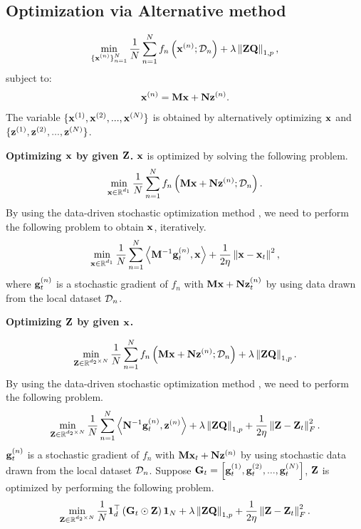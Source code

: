\documentclass[journal]{IEEEtran}
\begin{document}
\subsection{Optimization via Alternative method}

\begin{align}
\min_{\substack{\{{\bf x}^{(n)}\}_{n=1}^N}} \frac{1}{N}\sum_{n=1}^N f_n\left( {\bf x}^{(n)}; \mathcal{D}_n \right) + \lambda \left\lVert{\bf Z}{\bf Q}\right\rVert_{1,p},
\end{align} subject to:
\begin{align}
{\bf x}^{(n)} = {\bf M}{\bf x} + {\bf N} {\bf z}^{(n)}.
\end{align}
The variable $\{{\bf x}^{(1)}, {\bf x}^{(2)}, ..., {\bf x}^{(N)}\}$ is obtained by alternatively optimizing ${\bf x}$ and $\{{\bf z}^{(1)}, {\bf z}^{(2)}, ..., {\bf z}^{(N)}\}$.

\textbf{Optimizing ${\bf x}$ by given ${\bf Z}$.} ${\bf x}$ is optimized by solving the following problem.
\begin{align}
\min_{\substack{{\bf x}\in\mathbb{R}^{d_1}}} \frac{1}{N}\sum_{n=1}^N f_n\left( {\bf M}{\bf x} + {\bf N} {\bf z}^{(n)}; \mathcal{D}_n \right).
\end{align} By using the data-driven stochastic optimization method \cite{dd}, we need to perform the following problem to obtain ${\bf x}$, iteratively.
\begin{align}
\nonumber
\min_{\substack{{\bf x}\in\mathbb{R}^{d_1}}} \frac{1}{N}\sum_{n=1}^N \left\langle{\bf M}^{-1}{\bf g}_t^{(n)}, {\bf x} \right\rangle + \frac{1}{2\eta}\left\lVert{\bf x} - {\bf x}_t\right\rVert^2,
\end{align} where ${\bf g}_t^{(n)}$ is a stochastic gradient of $f_n$ with ${\bf M}{\bf x} + {\bf N} {\bf z}_t^{(n)}$ by using data drawn from the local dataset $\mathcal{D}_n$.


\textbf{Optimizing ${\bf Z}$ by given ${\bf x}$.}

\begin{align}
\min_{\substack{{\bf Z}\in\mathbb{R}^{d_2\times N}}} \frac{1}{N}\sum_{n=1}^N f_n\left( {\bf M}{\bf x} + {\bf N} {\bf z}^{(n)}; \mathcal{D}_n \right) + \lambda \left\lVert{\bf Z}{\bf Q}\right\rVert_{1,p}.
\end{align}  By using the data-driven stochastic optimization method \cite{dd}, we need to perform the following problem.
\begin{align}
\nonumber
\min_{\substack{{\bf Z}\in\mathbb{R}^{d_2\times N}}} \frac{1}{N}\sum_{n=1}^N \left\langle{\bf N}^{-1} {\bf g}_t^{(n)}, {\bf z}^{(n)} \right\rangle + \lambda \left\lVert{\bf Z}{\bf Q}\right\rVert_{1,p} + \frac{1}{2\eta}\left\lVert{\bf Z} - {\bf Z}_t\right\rVert_F^2.
\end{align} ${\bf g}_t^{(n)}$ is a stochastic gradient of $f_n$ with ${\bf M}{\bf x}_t + {\bf N} {\bf z}^{(n)}$ by using stochastic data  drawn from the local dataset $\mathcal{D}_n$. Suppose ${\bf G}_t = \left [ {\bf g}_t^{(1)}, {\bf g}_t^{(2)}, ..., {\bf g}_t^{(N)} \right ]$, ${\bf Z}$ is optimized by performing the following problem.
\begin{align}
\nonumber
\min_{\substack{{\bf Z}\in\mathbb{R}^{d_2\times N}}} \frac{1}{N}{\bf 1}_d^\top\left( {\bf G}_t \odot {\bf Z} \right){\bf 1}_N + \lambda \left\lVert{\bf Z}{\bf Q}\right\rVert_{1,p} + \frac{1}{2\eta}\left\lVert{\bf Z} - {\bf Z}_t\right\rVert_F^2.
\end{align}
\end{document}
